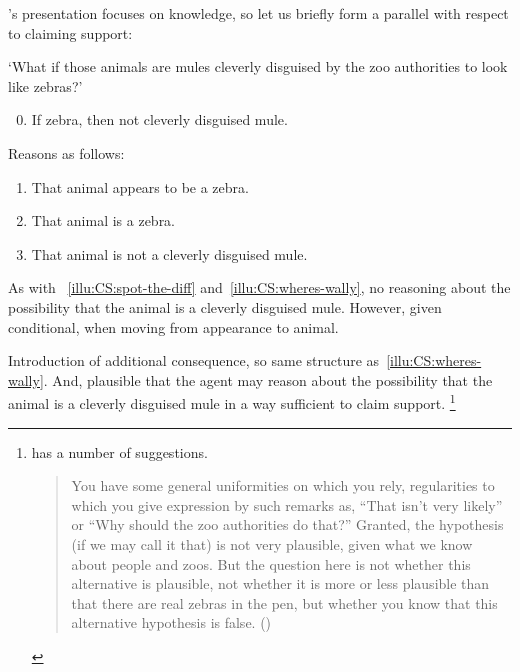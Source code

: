 \begin{note}
  \citeauthor{Dretske:1970to}'s presentation focuses on knowledge, so let us briefly form a parallel with respect to claiming support:

  \begin{illustration}
    \label{illu:dretske-zebra-var}
    \mbox{}
    `What if those animals are mules cleverly disguised by the zoo authorities to look like zebras?'
    \begin{enumerate}[label=\arabic*., ref=(I\ref{illu:CS:wheres-wally}.\arabic*)]
      \setcounter{enumi}{-1}
    \item If zebra, then not cleverly disguised mule.
    \end{enumerate}
    Reasons as follows:
    \begin{enumerate}[label=\arabic*., ref=(I\ref{illu:CS:wheres-wally}.\arabic*)]
    \item That animal appears to be a zebra.
    \item That animal is a zebra.
    \item That animal is not a cleverly disguised mule.
    \end{enumerate}
  \end{illustration}

  As with ~\ref{illu:CS:spot-the-diff} and~\ref{illu:CS:wheres-wally}, no reasoning about the possibility that the animal is a cleverly disguised mule.
  However, given conditional, \requ{} when moving from appearance to animal.

  Introduction of additional consequence, so same structure as~\autoref{illu:CS:wheres-wally}.
  And, plausible that the agent may reason about the possibility that the animal is a cleverly disguised mule in a way sufficient to claim support.\nolinebreak
  \footnote{
    \citeauthor{Dretske:1970to} has a number of suggestions.
    \begin{quote}
    You have some general uniformities on which you rely, regularities to which you give expression by such remarks as, ``That isn't very likely'' or ``Why should the zoo authorities do that?''
    Granted, the hypothesis (if we may call it that) is not very plausible, given what we know about people and zoos.
    But the question here is not whether this alternative is plausible, not whether it is more or less plausible than that there are real zebras in the pen, but whether you know that this alternative hypothesis is false.\nolinebreak
    \mbox{}\hfill\mbox{(\citeyear[1016]{Dretske:1970to})}
  \end{quote}
  }
\end{note}


